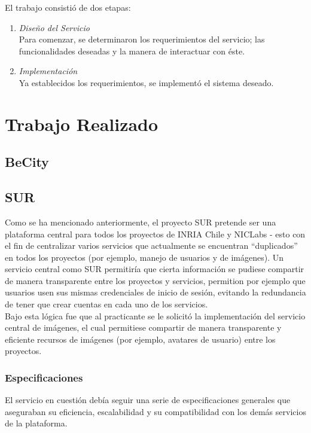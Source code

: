 \documentclass[11pt,letterpaper]{article}
\begin{document}
El trabajo consistió de dos etapas:
\begin{enumerate}
    \item \emph{Diseño del Servicio}\\ Para comenzar, se determinaron los requerimientos del servicio; las funcionalidades deseadas y la manera de interactuar con éste.
    \item \emph{Implementación}\\ Ya establecidos los requerimientos, se implementó el sistema deseado.
\end{enumerate}

\newpage
\section{Trabajo Realizado}

\subsection{BeCity}
\subsection{SUR}

Como se ha mencionado anteriormente, el proyecto SUR pretende ser una plataforma central para todos los proyectos de INRIA Chile y NICLabs - esto con el fin de centralizar varios servicios que actualmente se encuentran ``duplicados'' en todos los proyectos (por ejemplo, manejo de usuarios y de imágenes). Un servicio central como SUR permitiría que cierta información se pudiese compartir de manera transparente entre los proyectos y servicios, permition por ejemplo que usuarios usen sus mismas credenciales de inicio de sesión, evitando la redundancia de tener que crear cuentas en cada uno de los servicios.
\\
Bajo esta lógica fue que al practicante se le solicitó la implementación del servicio central de imágenes, el cual permitiese compartir de manera transparente y eficiente recursos de imágenes (por ejemplo, avatares de usuario) entre los proyectos.

\subsubsection{Especificaciones}

El servicio en cuestión debía seguir una serie de especificaciones generales que aseguraban su eficiencia, escalabilidad y su compatibilidad con los demás servicios de la plataforma.
\end{document}
